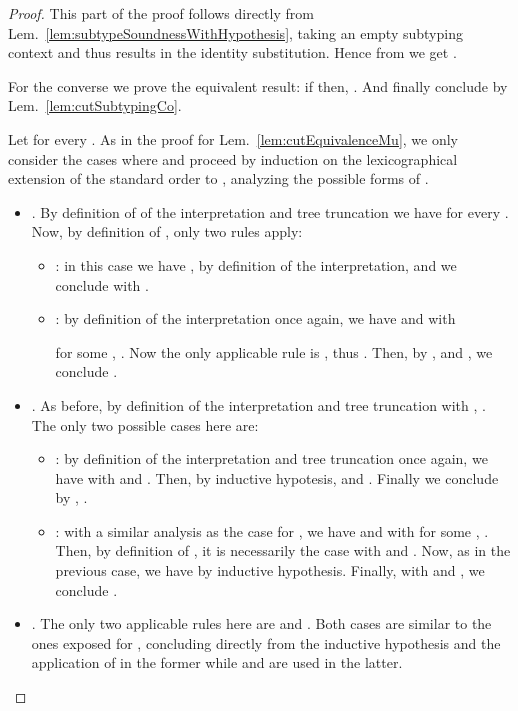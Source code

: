 \begin{proof}
 This part of the proof follows directly from
Lem.~\ref{lem:subtypeSoundnessWithHypothesis}, taking  an empty
subtyping context and thus  results in the identity substitution. Hence
from  we get .

 For the converse we prove the equivalent result: if  then, . And finally conclude by Lem.~\ref{lem:cutSubtypingCo}.

Let  for every . As in the proof for Lem.~\ref{lem:cutEquivalenceMu}, we only
consider the cases where  and proceed by induction on
the lexicographical extension of the standard order to
, analyzing the possible
forms of .\
\begin{itemize}
  \item . By definition of of the interpretation and tree truncation we
  have  for every . Now, by definition of
  , only two rules apply:
  \begin{itemize}
    \item : in this case we have , by definition of the interpretation, and we conclude with
    .
    
    \item : by definition of the interpretation once again, we
    have  and  with
    
    for some , . Now the only applicable rule is
    , thus . Then, by
    ,  and , we conclude
    .
  \end{itemize}
  
  \item . As before, by definition of the interpretation
  and tree truncation with , . The only two possible cases here are:
  \begin{itemize}
    \item : by definition of the interpretation and tree
    truncation once again, we have  with
     and
    . Then, by
    inductive hypotesis,  and . Finally we
    conclude by , .
    
    \item : with a similar analysis as the case
     for , we have 
    and  with  for some ,
    . Then, by definition of , it is necessarily the case
     with  and . Now, as in the previous case, we have
     by inductive hypothesis. Finally, with
     and , we conclude .
  \end{itemize}
  
  \item . The only two applicable rules here are
   and . Both cases are similar to the ones
  exposed for , concluding directly from the inductive hypothesis
  and the application of  in the former while
   and  are used in the latter.
  

\end{itemize}
\end{proof}
